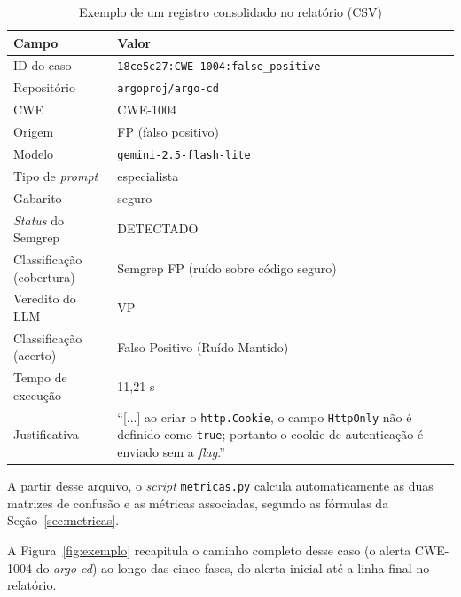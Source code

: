 \begin{table}[htpb]
    \centering
    \caption{Exemplo de um registro consolidado no relatório (CSV)}
    \label{tab:poc-registro}
    \begin{tabular}{|l|p{9.2cm}|}
        \hline
        \textbf{Campo} & \textbf{Valor} \\
        \hline
        ID do caso & \texttt{18ce5c27:CWE-1004:false\_positive} \\
        \hline
        Repositório & \texttt{argoproj/argo-cd} \\
        \hline
        CWE & CWE-1004 \\
        \hline
        Origem & FP (falso positivo) \\
        \hline
        Modelo & \texttt{gemini-2.5-flash-lite} \\
        \hline
        Tipo de \textit{prompt} & especialista \\
        \hline
        Gabarito & seguro \\
        \hline
        \textit{Status} do Semgrep & DETECTADO \\
        \hline
        Classificação (cobertura) & Semgrep FP (ruído sobre código seguro) \\
        \hline
        Veredito do LLM & VP \\
        \hline
        Classificação (acerto) & Falso Positivo (Ruído Mantido) \\
        \hline
        Tempo de execução & 11,21 s \\
        \hline
        Justificativa & ``[...] ao criar o \texttt{http.Cookie}, o campo \texttt{HttpOnly} não é definido como \texttt{true}; portanto o cookie de autenticação é enviado sem a \textit{flag}.'' \\
        \hline
    \end{tabular}
    \fontepesquisa
\end{table}

A partir desse arquivo, o \textit{script} \texttt{metricas.py} calcula automaticamente as duas matrizes de confusão e as métricas associadas, segundo as fórmulas da Seção~\ref{sec:metricas}.

A Figura~\ref{fig:exemplo} recapitula o caminho completo desse caso (o alerta CWE-1004 do \textit{argo-cd}) ao longo das cinco fases, do alerta inicial até a linha final no relatório.

